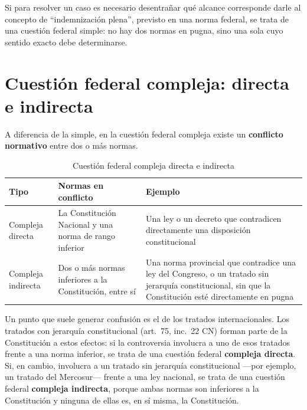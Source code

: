 \documentclass[12pt,oneside]{book}
\begin{document}
\begin{exbox}
Si para resolver un caso es necesario desentrañar qué alcance corresponde darle al
concepto de ``indemnización plena'', previsto en una norma federal, se trata de una
cuestión federal simple: no hay dos normas en pugna, sino una sola cuyo sentido
exacto debe determinarse.
\end{exbox}

\section{Cuestión federal compleja: directa e indirecta}

\begin{defbox}
A diferencia de la simple, en la cuestión federal compleja existe un
\textbf{conflicto normativo} entre dos o más normas.
\end{defbox}

\begin{table}[H]
\centering
\caption{Cuestión federal compleja directa e indirecta}
\begin{tabularx}{\textwidth}{@{}lXX@{}}
\toprule
\textbf{Tipo} & \textbf{Normas en conflicto} & \textbf{Ejemplo} \\
\midrule
Compleja directa & La Constitución Nacional y una norma de rango inferior & Una
ley o un decreto que contradicen directamente una disposición constitucional \\
Compleja indirecta & Dos o más normas inferiores a la Constitución, entre sí &
Una norma provincial que contradice una ley del Congreso, o un tratado sin
jerarquía constitucional, sin que la Constitución esté directamente en pugna \\
\bottomrule
\end{tabularx}
\end{table}

Un punto que suele generar confusión es el de los tratados internacionales. Los
tratados con jerarquía constitucional (art.\ 75, inc.\ 22 CN) forman parte de la
Constitución a estos efectos: si la controversia involucra a uno de esos tratados
frente a una norma inferior, se trata de una cuestión federal \textbf{compleja
directa}. Si, en cambio, involucra a un tratado sin jerarquía constitucional
—por ejemplo, un tratado del Mercosur— frente a una ley nacional, se trata de una
cuestión federal \textbf{compleja indirecta}, porque ambas normas son inferiores a
la Constitución y ninguna de ellas es, en sí misma, la Constitución.
\end{document}
